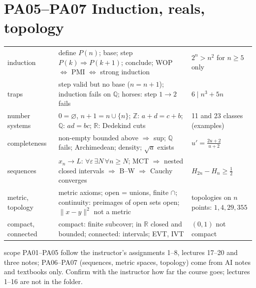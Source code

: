 \documentclass[9pt]{article}
\begin{document}
\section*{PA05--PA07 Induction, reals, topology}
\begin{tabular}{@{}p{2.9cm}p{8.4cm}p{6.1cm}@{}}
\toprule
induction & define $P(n)$; base; step $P(k)\Rightarrow P(k+1)$; conclude; WOP $\Leftrightarrow$ PMI $\Leftrightarrow$ strong induction & $2^n>n^2$ for $n\ge5$ only\\
traps & step valid but no base ($n=n+1$); induction fails on $\mathbb Q$; horses: step $1\to2$ fails & $6\mid n^3+5n$\\
number systems & $0=\varnothing$, $n+1=n\cup\{n\}$; $\mathbb Z$: $a+d=c+b$; $\mathbb Q$: $ad=bc$; $\mathbb R$: Dedekind cuts & 11 and 23 classes (examples)\\
completeness & non-empty bounded above $\Rightarrow$ sup; $\mathbb Q$ fails; Archimedean; density; $\sqrt a$ exists & $u'=\tfrac{2u+2}{u+2}$\\
sequences & $x_n\to L$: $\forall\varepsilon\,\exists N\,\forall n\ge N$; MCT $\Rightarrow$ nested closed intervals $\Rightarrow$ B--W $\Rightarrow$ Cauchy converges & $H_{2n}-H_n\ge\tfrac12$\\
metric, topology & metric axioms; open = unions, finite $\cap$; continuity: preimages of open sets open; $\|x-y\|^2$ not a metric & topologies on $n$ points: $1,4,29,355$\\
compact, connected & compact: finite subcover; in $\mathbb R$ closed and bounded; connected: intervals; EVT, IVT & $(0,1)$ not compact\\
\bottomrule
\end{tabular}

\vspace{3pt}
\begin{verifybox}{scope}
PA01--PA05 follow the instructor's assignments 1--8, lectures 17--20 and three notes; PA06--PA07 (sequences, metric spaces, topology) come from AI notes and textbooks only. Confirm with the instructor how far the course goes; lectures 1--16 are not in the folder.
\end{verifybox}
\end{document}
